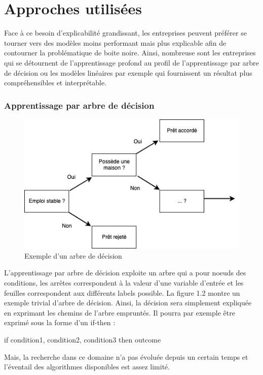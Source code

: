 \section{Approches utilisées}
Face à ce besoin d'explicabilité grandissant, les entreprises peuvent préférer se tourner vers des modèles moins performant mais plus explicable afin de contourner la problématique de boite noire. Ainsi, nombreuse sont les entreprises qui se détournent de l'apprentissage profond au profil de l'apprentissage par arbre de décision ou les modèles linéaires par exemple qui fournissent un résultat plus compréhensibles et interprétable.
\subsubsection{Apprentissage par arbre de décision}
\begin{figure}[h]
\centering
\includegraphics[scale=0.5]{src_img/decision_tree.jpg}
\caption{Exemple d'un arbre de décision}
\label{decision_tree}
\end{figure}
L'apprentissage par arbre de décision exploite un arbre qui a pour noeuds des conditions, les arrêtes correspondent à la valeur d'une variable d'entrée et les feuilles correspondent aux différents labels possible. La figure 1.2 montre un exemple trivial d'arbre de décision. Ainsi, la décision sera simplement expliquée en exprimant les chemins de l'arbre empruntés. Il pourra par exemple être exprimé sous la forme d'un if-then :

if condition1, condition2, condition3 then outcome

Mais, la recherche dans ce domaine n'a pas évoluée depuis un certain temps et l'éventail des algorithmes disponibles est assez limité.

